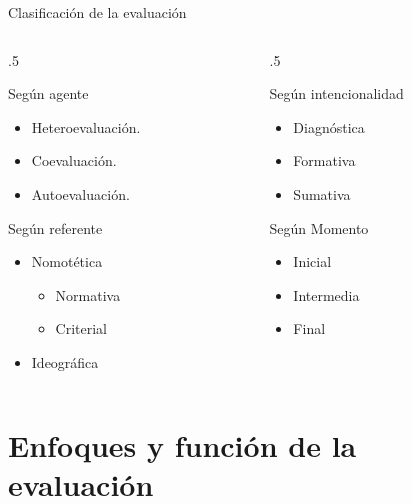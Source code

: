 \documentclass[11pt, aspectratio=169, xcolor=table,hyphens]{beamer}
\begin{document}
\begin{frame}{Clasificación de la evaluación \cite{CASTILLO2010}}
	\begin{columns}
		\begin{column}{.5\textwidth}
			\begin{block}{Según agente}
				\begin{itemize}[<+->]
					\item Heteroevaluación.
					\item Coevaluación.
					\item Autoevaluación.
				\end{itemize}
			\end{block}
			\begin{block}{Según referente}
				\begin{itemize}[<+->]
					\item Nomotética
					      \begin{itemize}[<+->]
						      \item Normativa
						      \item Criterial
					      \end{itemize}
					\item Ideográfica
				\end{itemize}
			\end{block}
		\end{column}
		\begin{column}{.5\textwidth}
			\begin{block}{Según intencionalidad}
				\begin{itemize}[<+->]
					\item Diagnóstica
					\item Formativa
					\item Sumativa
				\end{itemize}
			\end{block}
			\begin{block}{Según Momento}
				\begin{itemize}[<+->]
					\item Inicial
					\item Intermedia
					\item Final
				\end{itemize}
			\end{block}
		\end{column}
	\end{columns}
\end{frame}

\section{Enfoques y función de la evaluación}
\end{document}
